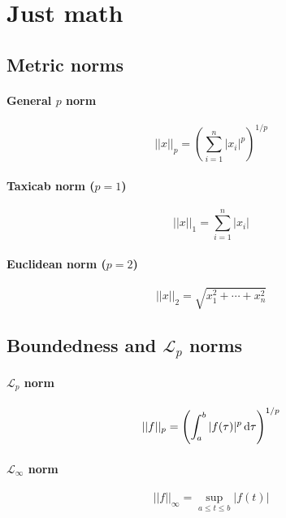 \section{Just math}

\subsection{Metric norms}
\paragraph{General $p$ norm}
\begin{equation}
	||x||_p
	=
	\left(
		\sum_{i=1}^{n} |x_i|^p
	\right)
	^{1/p}
\end{equation}

\paragraph{Taxicab norm ($p=1$)}
\begin{equation}
	||x||_1
	=
	\sum_{i=1}^{n} |x_i|
\end{equation}

\paragraph{Euclidean norm ($p=2$)}
\begin{equation}
	||x||_2
	=
	\sqrt{x_1^2 + \cdots + x_n^2}
\end{equation}

\subsection{Boundedness and $\mathscr{L}_p$ norms}
\paragraph{$\mathscr{L}_p$ norm}
\begin{equation}
	||f||_p
	=
	\left(
		\int_a^b |f(\tau)|^p \dif \tau
	\right)^{1/p}
\end{equation}

\paragraph{$\mathscr{L}_\infty$ norm}
\begin{equation}
	||f||_\infty
	=
	\sup_{a \leq t \leq b} |f(t)|
\end{equation}

